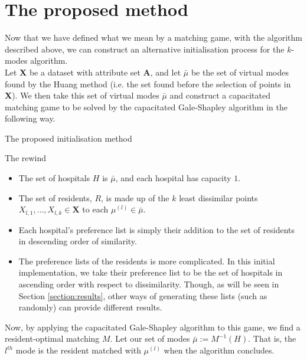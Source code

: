 \documentclass{article}
\theoremstyle{definition}
\begin{document}
\section{The proposed method}\label{section:new-method}

Now that we have defined what we mean by a matching game, with the algorithm 
described above, we can construct an alternative initialisation process for the 
$k$-modes algorithm. \\

Let \textbf{X} be a dataset with attribute set \textbf{A}, and let $\bar{\mu}$ 
be the set of virtual modes found by the Huang method (i.e. the set found before
the selection of points in \textbf{X}). We then take this set of virtual modes 
$\bar{\mu}$ and construct a capacitated matching game to be solved by the
capacitated Gale-Shapley algorithm in the following way.

\begin{algorithm}[H]
\caption{The proposed initialisation method}
    \begin{algorithmic}[0]
            \State The rewind
        \EndFor
    \end{algorithmic}
\end{algorithm}



\begin{itemize}
	\item The set of hospitals $H$ is $\bar{\mu}$, and each hospital has capacity $1$.

	\item The set of residents, $R$, is made up of the $k$ least dissimilar points $X_{l,1}, \ldots, X_{l,k} \in \textbf{X}$ to each $\mu^{(l)} \in \bar{\mu}$.

	\item Each hospital's preference list is simply their addition to the set of residents in descending order of similarity.
	
	\item The preference lists of the residents is more complicated. In this initial implementation, we take their preference list to be the set of hospitals in ascending order with respect to dissimilarity. Though, as will be seen in Section \ref{section:results}, other ways of generating these lists (such as randomly) can provide different results.
\end{itemize}

Now, by applying the capacitated Gale-Shapley algorithm to this game, we find a resident-optimal matching $M$. Let our set of modes $\bar{\mu} := M^{-1}(H)$. That is, the $l^{th}$ mode is the resident matched with $\mu^{(l)}$ when the algorithm concludes.
\end{document}
